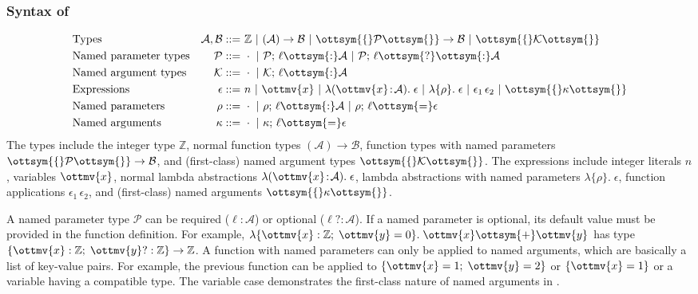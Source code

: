 \subsubsection{Syntax of \uaena}
\begin{align*}
  &\text{Types}                 &\mathcal{A},\mathcal{B} ::=&~  \mathbb{Z}  ~|~  ( \mathcal{A} ) \rightarrow \mathcal{B}  ~|~ \ottsym{\{}  \mathcal{P}  \ottsym{\}}  \rightarrow  \mathcal{B} ~|~ \ottsym{\{}  \mathcal{K}  \ottsym{\}} \\
  &\text{Named parameter types} &        \mathcal{P} ::=&~  \cdot  ~|~ \mathcal{P}  ;\,  \ell  \ottsym{:}  \mathcal{A} ~|~ \mathcal{P}  ;\,  \ell  \ottsym{\mbox{?}}  \ottsym{:}  \mathcal{A} \\
  &\text{Named argument types}  &        \mathcal{K} ::=&~  \cdot  ~|~ \mathcal{K}  ;\,  \ell  \ottsym{:}  \mathcal{A} \\
  &\text{Expressions}           &       \epsilon ::=&~  n  ~|~ \ottmv{x} ~|~  \lambda ( \ottmv{x} \!:\! \mathcal{A} ).\; \epsilon  ~|~  \lambda \{ \rho \}.\; \epsilon  ~|~ \epsilon_{{\mathrm{1}}} \, \epsilon_{{\mathrm{2}}} ~|~ \ottsym{\{}  \kappa  \ottsym{\}} \\
  &\text{Named parameters}      &        \rho ::=&~  \cdot  ~|~ \rho  ;\,  \ell  \ottsym{:}  \mathcal{A} ~|~ \rho  ;\,  \ell  \ottsym{=}  \epsilon \\
  &\text{Named arguments}       &        \kappa ::=&~  \cdot  ~|~ \kappa  ;\,  \ell  \ottsym{=}  \epsilon
\end{align*}
The types include the integer type $ \mathbb{Z} $, normal function types $ ( \mathcal{A} ) \rightarrow \mathcal{B} $,
function types with named parameters $\ottsym{\{}  \mathcal{P}  \ottsym{\}}  \rightarrow  \mathcal{B}$, and (first-class)
named argument types $\ottsym{\{}  \mathcal{K}  \ottsym{\}}$. The expressions include integer literals
$ n $, variables $\ottmv{x}$, normal lambda abstractions $ \lambda ( \ottmv{x} \!:\! \mathcal{A} ).\; \epsilon $,
lambda abstractions with named parameters $ \lambda \{ \rho \}.\; \epsilon $, function applications
$\epsilon_{{\mathrm{1}}} \, \epsilon_{{\mathrm{2}}}$, and (first-class) named arguments $\ottsym{\{}  \kappa  \ottsym{\}}$.

A named parameter type $\mathcal{P}$ can be required ($\ell:\mathcal{A}$) or optional
($\ell?:\mathcal{A}$). If a named parameter is optional, its default value must be
provided in the function definition. For example,
$\lambda\{\ottmv{x}: \mathbb{Z} ;\;\ottmv{y}=0\}.\;\ottmv{x}  \ottsym{+}  \ottmv{y}$ has type
$\{\ottmv{x}: \mathbb{Z} ;\;\ottmv{y}?: \mathbb{Z} \} \rightarrow  \mathbb{Z} $. A function with named
parameters can only be applied to named arguments, which are basically a list of
key-value pairs. For example, the previous function can be applied to
$\{\ottmv{x}=1;\;\ottmv{y}=2\}$ or $\{\ottmv{x}=1\}$ or a variable having a compatible type.
The variable case demonstrates the first-class nature of named arguments in \uaena.

